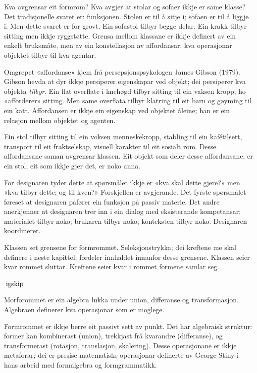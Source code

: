 Kva avgrensar eit formrom? Kva avgjer at stolar og sofaer ikkje er same klasse? Det tradisjonelle svaret er: funksjonen. Stolen er til å sitje i; sofaen er til å liggje i. Men dette svaret er for grovt. Ein sofastol tilbyr begge delar. Ein krakk tilbyr sitting men ikkje ryggstøtte. Grensa mellom klassane er ikkje definert av ein enkelt bruksmåte, men av ein konstellasjon av affordansar: kva operasjonar objektet tilbyr til kva agentar.

Omgrepet «affordanse» kjem frå persepsjonspsykologen James Gibson (1979). Gibson hevda at dyr ikkje persiperer eigenskapar ved objekt; dei persiperer kva objekta \textit{tilbyr}. Ein flat overflate i knehøgd tilbyr sitting til ein vaksen kropp; ho «afforderer» sitting. Men same overflata tilbyr klatring til eit barn og gøyming til ein katt. Affordansen er ikkje ein eigenskap ved objektet åleine; han er ein relasjon mellom objektet og agenten.

Ein stol tilbyr sitting til ein voksen menneskekropp, stabling til ein kafétilsett, transport til eit fraktselskap, visuell karakter til eit sosialt rom. Desse affordansane saman avgrensar klassen. Eit objekt som deler desse affordansane, er ein stol; eit som ikkje gjer det, er noko anna.

For designaren tyder dette at spørsmålet ikkje er «kva skal dette gjere?» men «kva tilbyr dette; og til kven?» Forskjellen er avgjerande. Det fyrste spørsmålet føreset at designaren påfører ein funksjon på passiv materie. Det andre anerkjenner at designaren trer inn i ein dialog med eksisterande kompetansar; materialet tilbyr noko; brukaren tilbyr noko; konteksten tilbyr noko. Designaren koordinerer.

Klassen set grensene for formrommet. Seleksjonstrykka; dei kreftene me skal definere i neste kapittel; fordeler innhaldet innanfor desse grensene. Klassen seier kvar rommet sluttar. Kreftene seier kvar i rommet formene samlar seg.

igskip

Morforommet er ein algebra lukka under union, differanse og transformasjon. Algebraen definerer kva operasjonar som er moglege.

Formrommet er ikkje berre eit passivt sett av punkt. Det har algebraisk struktur: former kan kombinerast (union), trekkjast frå kvarandre (differanse), og transformerast (rotasjon, translasjon, skalering). Desse operasjonane er ikkje metaforar; dei er presise matematiske operasjonar definerte av George Stiny i hans arbeid med formalgebra og formgrammatikk.

